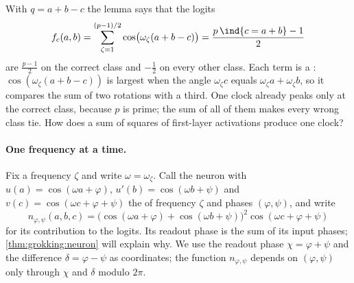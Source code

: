 \begin{refsection}
With $q=a+b-c$ the lemma says that the logits
\begin{equation}\label{eq:grokking:target}
  f_c(a,b)=\sum_{\zeta=1}^{(p-1)/2}\cos\bigl(\omega_\zeta(a+b-c)\bigr)=\frac{p\,\ind\{c=a+b\}-1}{2}
\end{equation}
are $\frac{p-1}2$ on the correct class and $-\frac12$ on every other class. Each term is a : $\cos(\omega_\zeta(a+b-c))$ is largest when the angle $\omega_\zeta c$ equals $\omega_\zeta a+\omega_\zeta b$, so it compares the sum of two rotations with a third. One clock already peaks only at the correct class, because $p$ is prime; the sum of all of them makes every wrong class tie. How does a sum of squares of first-layer activations produce one clock?

\paragraph{One frequency at a time.} Fix a frequency $\zeta$ and write $\omega=\omega_\zeta$. Call the neuron with $u(a)=\cos(\omega a+\varphi)$, $u'(b)=\cos(\omega b+\psi)$ and $v(c)=\cos(\omega c+\varphi+\psi)$ the  of frequency $\zeta$ and phases $(\varphi,\psi)$, and write
\[
  n_{\varphi,\psi}(a,b,c)=\bigl(\cos(\omega a+\varphi)+\cos(\omega b+\psi)\bigr)^2\cos(\omega c+\varphi+\psi)
\]
for its contribution to the logits. Its readout phase is the sum of its input phases; \cref{thm:grokking:neuron} will explain why. We use the readout phase $\chi=\varphi+\psi$ and the difference $\delta=\varphi-\psi$ as coordinates; the function $n_{\varphi,\psi}$ depends on $(\varphi,\psi)$ only through $\chi$ and $\delta$ modulo $2\pi$.



\end{refsection}
